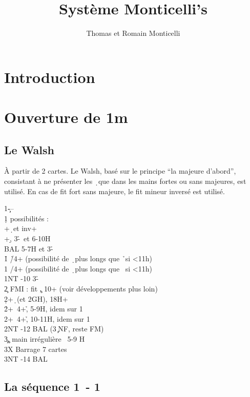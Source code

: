 \documentclass[a4paper]{article}
\title{Système Monticelli's}
\author{Thomas et Romain Monticelli}
\begin{document}
\maketitle
\tableofcontents

\section{Introduction}

\section{Ouverture de 1m}

\subsection{Le Walsh}

À partir de 2 cartes. Le Walsh, basé sur le principe ``la majeure d'abord'', consistant à ne présenter les \d\ que dans les mains fortes ou sans majeures, est utilisé.
En cas de fit fort sans majeure, le fit mineur inversé est utilisé.

\begin{bidtable}
1\c---\\
1\d {} possibilités :\\
+\d\ et inv+\\
+\d , 3-\h \s\ et 6-10H\\
\>BAL 5-7H et 3-\h \s \\
1\h \> \h /4+ (possibilité de \d\ plus longs que \h\ si <11h)\\
1\s \> \s /4+ (possibilité de \d\ plus longs que \s\ si <11h)\\
1NT -10 3-\h \s \\
2\c \> FMI : fit \c , 10+ (voir développements plus loin)\\
2\d {}+\d\ (et 2GH), 18H+\\
2\h {}+\s\ 4+\h , 5-9H, idem sur 1\d \\
2\s {}+\s\ 4+\h , 10-11H, idem sur 1\d \\
2NT	 -12 BAL (3\c\ NF, reste FM)\\
3\c	 {}\c , main irrégulière ~5-9 H\\
3X	 \> Barrage 7 cartes\\
3NT	 -14 BAL
\end{bidtable}

\subsection{La séquence 1\pdfc\ - 1\pdfd}
\end{document}
